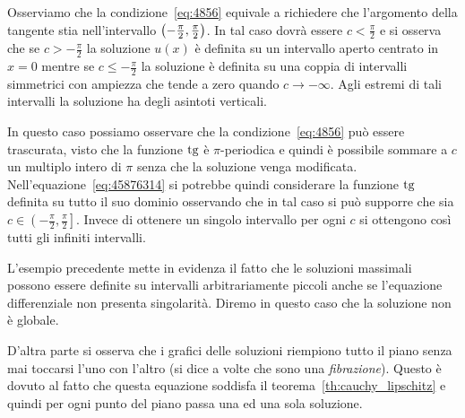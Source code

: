 \begin{example}
Osserviamo che la condizione~\eqref{eq:4856} equivale a richiedere che l'argomento
della tangente stia nell'intervallo ${\left( -\frac \pi 2, \frac \pi 2 \right)}$.
In tal caso dovrà essere $c<\frac\pi 2$ e si osserva che se $c>-\frac \pi 2$
la soluzione $u(x)$ è definita su un intervallo aperto centrato in $x=0$ mentre
se $c \le -\frac \pi 2$ la soluzione è definita su una coppia di intervalli
simmetrici con ampiezza che tende a zero quando $c\to -\infty$.
Agli estremi di tali intervalli la soluzione ha degli asintoti verticali.

In questo caso possiamo osservare che la condizione~\eqref{eq:4856} può essere
trascurata, visto che la funzione $\operatorname{tg}$ è $\pi$-periodica e quindi
è possibile sommare a $c$ un multiplo intero di $\pi$ senza che la soluzione
venga modificata.
Nell'equazione~\eqref{eq:45876314} si potrebbe
quindi considerare la funzione $\operatorname{tg}$
definita su tutto il suo dominio osservando che in tal caso si può
supporre che sia $c\in \left(-\frac \pi 2, \frac \pi 2\right]$.
Invece di ottenere un singolo intervallo per ogni $c$ si ottengono così
tutti gli infiniti intervalli.
\end{example}

\begin{remark}
L'esempio precedente mette in evidenza il fatto che le soluzioni massimali possono essere definite
su intervalli arbitrariamente piccoli anche se l'equazione differenziale
non presenta singolarità. Diremo in questo caso che
la soluzione non è globale.

D'altra parte si osserva che i grafici delle soluzioni riempiono tutto il piano senza 
mai toccarsi l'uno con l'altro (si dice a volte che sono una \emph{fibrazione}).
Questo è dovuto al fatto che questa equazione soddisfa il 
teorema~\ref{th:cauchy_lipschitz} e quindi per ogni punto 
del piano passa una ed una sola soluzione.
\end{remark}

